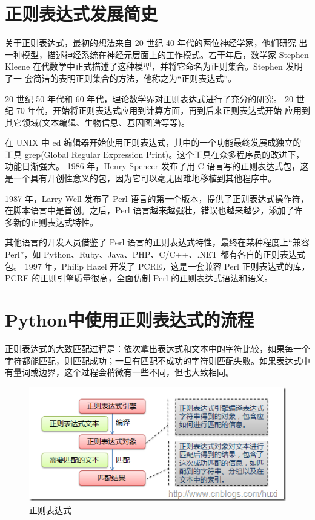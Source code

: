\documentclass[]{ctexbook}
\begin{document}
\hypertarget{ux6b63ux5219ux8868ux8fbeux5f0fux53d1ux5c55ux7b80ux53f2}{%
\section{正则表达式发展简史}\label{ux6b63ux5219ux8868ux8fbeux5f0fux53d1ux5c55ux7b80ux53f2}}

关于正则表达式，最初的想法来自 20 世纪 40 年代的两位神经学家，他们研究 出一种模型，描述神经系统在神经元层面上的工作模式。若干年后，数学家 Stephen Kleene 在代数学中正式描述了这种模型，并将它命名为正则集合。Stephen 发明了一 套简洁的表明正则集合的方法，他称之为``正则表达式''。

20 世纪 50 年代和 60 年代，理论数学界对正则表达式进行了充分的研究。
20 世纪 70 年代，开始将正则表达式应用到计算方面，再到后来正则表达式开始 应用到其它领域(文本编辑、生物信息、基因图谱等等)。

在 UNIX 中 ed 编辑器开始使用正则表达式，其中的一个功能最终发展成独立的 工具 grep(Global Regular Expression Print)。这个工具在众多程序员的改进下，功能日渐强大。
1986 年，Henry Spencer 发布了用 C 语言写的正则表达式包，这是一个具有开创性意义的包，因为它可以毫无困难地移植到其他程序中。

1987 年，Larry Well 发布了 Perl 语言的第一个版本，提供了正则表达式操作符， 在脚本语言中是首创。之后，Perl 语言越来越强壮，错误也越来越少，添加了许多新的正则表达式特性。

其他语言的开发人员借鉴了 Perl 语言的正则表达式特性，最终在某种程度上``兼容 Perl''，如 Python、Ruby、Java、PHP、C/C++、.NET 都有各自的正则表达式包。 1997 年，Philip Hazel 开发了 PCRE，这是一套兼容 Perl 正则表达式的库，PCRE 的正则引擎质量很高，全面仿制 Perl 的正则表达式语法和语义。

\hypertarget{pythonux4e2dux4f7fux7528ux6b63ux5219ux8868ux8fbeux5f0fux7684ux6d41ux7a0b}{%
\section{Python中使用正则表达式的流程}\label{pythonux4e2dux4f7fux7528ux6b63ux5219ux8868ux8fbeux5f0fux7684ux6d41ux7a0b}}

正则表达式的大致匹配过程是：依次拿出表达式和文本中的字符比较，如果每一个字符都能匹配，则匹配成功；一旦有匹配不成功的字符则匹配失败。如果表达式中有量词或边界，这个过程会稍微有一些不同，但也大致相同。

\begin{figure}
\centering
\includegraphics{images/pyreflow.png}
\caption{正则表达式}
\end{figure}
\end{document}
